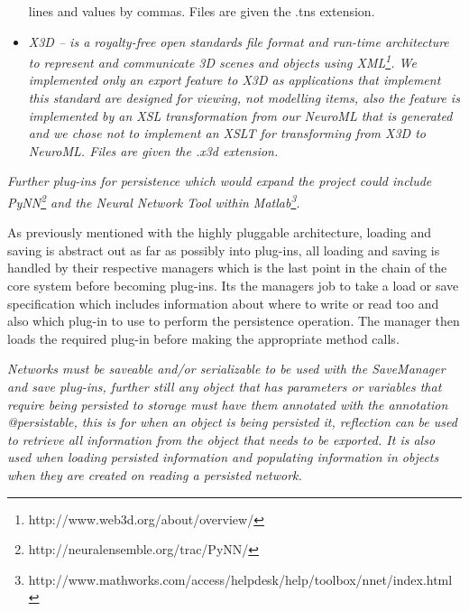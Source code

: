 \documentclass[12pt,twoside]{article}
\begin{document}
\begin{itemize}
{{{lines and values by commas. Files are given the
}}\textmd{.tns}\textmd{\textup{ extension.}}}
\item {\itshape
\textmd{X3D}\textmd{\textup{ {--} is a royalty{}-free open standards
file format and run{}-time architecture to represent and communicate 3D
scenes and objects using
XML}}\footnote{http://www.web3d.org/about/overview/}\textmd{\textup{.
We implemented only an export feature to X3D as applications that
implement this standard are designed for viewing, not modelling items,
also the feature is implemented by an XSL transformation from our
NeuroML that is generated and we chose not to implement an XSLT for
transforming from X3D to NeuroML. Files are given the
}}\textmd{.x3d}\textmd{\textup{ extension.}}}
\end{itemize}

\bigskip

{\itshape
\textmd{\textup{Further plug{}-ins for persistence which would expand
the project could include
PyNN}}\footnote{http://neuralensemble.org/trac/PyNN/}\textmd{\textup{
and the Neural Network Tool within
Matlab}}\footnote{http://www.mathworks.com/access/helpdesk/help/toolbox/nnet/index.html}\textmd{\textup{.}}}


{\mdseries\upshape
As previously mentioned with the highly pluggable architecture, loading
and saving is abstract out as far as possibly into plug{}-ins, all
loading and saving is handled by their respective managers which is the
last point in the chain of the core system before becoming plug{}-ins.
Its the managers job to take a load or save specification which
includes information about where to write or read too and also which
plug{}-in to use to perform the persistence operation. The manager then
loads the required plug{}-in before making the appropriate method
calls.}


\bigskip

{\mdseries\itshape
\textup{Networks must be saveable and/or serializable to be used with
the }SaveManager \textup{and save plug{}-ins, further still any object
that has parameters or variables that require being persisted to
storage must have them annotated with the annotation
}@persistable\textup{, this is for when an object is being persisted
it, reflection can be used to retrieve all information from the object
that needs to be exported. It is also used when loading persisted
information and populating information in objects when they are created
on reading a persisted network.}}
\end{document}
